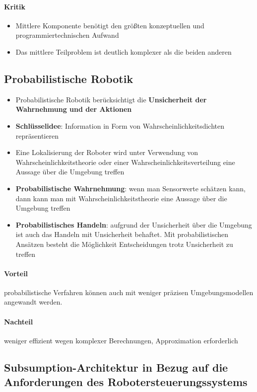 \paragraph{Kritik}
\begin{itemize}
	\item Mittlere Komponente benötigt den größten konzeptuellen und programmiertechnischen Aufwand
	\item Das mittlere Teilproblem ist deutlich komplexer als die beiden anderen
\end{itemize}
\subsection{Probabilistische Robotik}
\begin{itemize}
	\item Probabilistische Robotik berücksichtigt die \textbf{Unsicherheit der Wahrnehmung und der Aktionen}
	\item \textbf{Schlüsselidee}: Information in Form von Wahrscheinlichkeitsdichten repräsentieren
	\item Eine Lokalisierung der Roboter wird unter Verwendung von Wahrscheinlichkeitstheorie oder einer Wahrscheinlichkeitsverteilung eine Aussage über die Umgebung treffen
	\item \textbf{Probabilistische Wahrnehmung}: wenn man Sensorwerte schätzen kann, dann kann man mit Wahrscheinlichkeitstheorie eine Aussage über die Umgebung treffen
	\item \textbf{Probabilistisches Handeln}: aufgrund der Unsicherheit über die Umgebung ist auch das Handeln mit Unsicherheit behaftet.
	Mit probabilistischen Ansätzen besteht die Möglichkeit Entscheidungen trotz Unsicherheit zu treffen
\end{itemize}
\paragraph{Vorteil} probabilistische Verfahren können auch mit weniger präzisen Umgebungsmodellen angewandt werden.
\paragraph{Nachteil} weniger effizient wegen komplexer Berechnungen, Approximation erforderlich
\subsection{Subsumption-Architektur in Bezug auf die Anforderungen des Robotersteuerungssystems}
